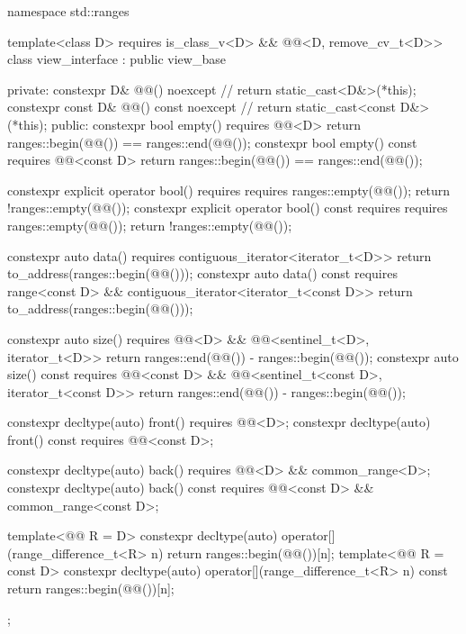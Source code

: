 %
\begin{codeblock}
namespace std::ranges {
  template<class D>
    requires is_class_v<D> && @@<D, remove_cv_t<D>>
  class view_interface : public view_base {
  private:
    constexpr D& @@() noexcept {                   // \expos
      return static_cast<D&>(*this);
    }
    constexpr const D& @@() const noexcept {       // \expos
      return static_cast<const D&>(*this);
    }
  public:
    constexpr bool empty() requires @@<D> {
      return ranges::begin(@@()) == ranges::end(@@());
    }
    constexpr bool empty() const requires @@<const D> {
      return ranges::begin(@@()) == ranges::end(@@());
    }

    constexpr explicit operator bool()
      requires requires { ranges::empty(@@()); } {
        return !ranges::empty(@@());
      }
    constexpr explicit operator bool() const
      requires requires { ranges::empty(@@()); } {
        return !ranges::empty(@@());
      }

    constexpr auto data() requires contiguous_iterator<iterator_t<D>> {
      return to_address(ranges::begin(@@()));
    }
    constexpr auto data() const
      requires range<const D> && contiguous_iterator<iterator_t<const D>> {
        return to_address(ranges::begin(@@()));
      }

    constexpr auto size() requires @@<D> &&
      @@<sentinel_t<D>, iterator_t<D>> {
        return ranges::end(@@()) - ranges::begin(@@());
      }
    constexpr auto size() const requires @@<const D> &&
      @@<sentinel_t<const D>, iterator_t<const D>> {
        return ranges::end(@@()) - ranges::begin(@@());
      }

    constexpr decltype(auto) front() requires @@<D>;
    constexpr decltype(auto) front() const requires @@<const D>;

    constexpr decltype(auto) back() requires @@<D> && common_range<D>;
    constexpr decltype(auto) back() const
      requires @@<const D> && common_range<const D>;

    template<@@ R = D>
      constexpr decltype(auto) operator[](range_difference_t<R> n) {
        return ranges::begin(@@())[n];
      }
    template<@@ R = const D>
      constexpr decltype(auto) operator[](range_difference_t<R> n) const {
        return ranges::begin(@@())[n];
      }
  };
}
\end{codeblock}

